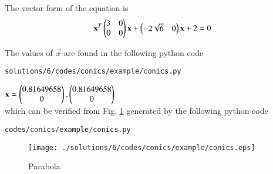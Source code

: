 The vector form of the equation is 
\begin{align}
\mathbf{x}^T\begin{pmatrix}3&0\\0&0\end{pmatrix}\mathbf{x}+\begin{pmatrix}-2\sqrt{6}&0\end{pmatrix}\mathbf{x}+2 = 0
\end{align}

The values of $\vec{x}$ are found in the following python code
\begin{lstlisting}
solutions/6/codes/conics/example/conics.py
\end{lstlisting}

$\mathbf{x}=\begin{pmatrix}0.81649658\\0\end{pmatrix}, \begin{pmatrix}0.81649658\\0\end{pmatrix}$ \\
which can be verified from  Fig. \ref{fig:5.1.6_parabola} 
generated by the following python code 
\begin{lstlisting}
codes/conics/example/conics.py
\end{lstlisting}
\begin{figure}[!ht]
\texttt{[image: ./solutions/6/codes/conics/example/conics.eps]}
\caption{Parabola}
\label{fig:5.1.6_parabola}
\end{figure} 
